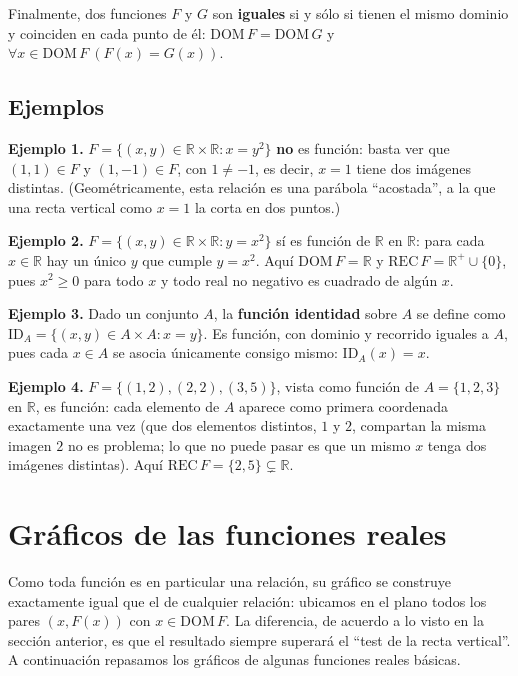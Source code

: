 \documentclass[11pt]{article}
\begin{document}
Finalmente, dos funciones $F$ y $G$ son \textbf{iguales} si y sólo si tienen el mismo dominio y
coinciden en cada punto de él: $\text{DOM}\, F = \text{DOM}\, G$ y
$\forall x \in \text{DOM}\, F \ (F(x) = G(x))$.

\subsection*{Ejemplos}

\textbf{Ejemplo 1.} $F = \{(x,y) \in \mathbb{R}\times\mathbb{R} : x = y^2\}$ \textbf{no} es función:
basta ver que $(1,1) \in F$ y $(1,-1) \in F$, con $1 \neq -1$, es decir, $x=1$ tiene dos imágenes
distintas. (Geométricamente, esta relación es una parábola ``acostada'', a la que una recta
vertical como $x=1$ la corta en dos puntos.)

\textbf{Ejemplo 2.} $F = \{(x,y) \in \mathbb{R}\times\mathbb{R} : y = x^2\}$ sí es función de
$\mathbb{R}$ en $\mathbb{R}$: para cada $x \in \mathbb{R}$ hay un único $y$ que cumple $y = x^2$.
Aquí $\text{DOM}\, F = \mathbb{R}$ y $\text{REC}\, F = \mathbb{R}^+ \cup \{0\}$, pues $x^2 \ge 0$
para todo $x$ y todo real no negativo es cuadrado de algún $x$.

\textbf{Ejemplo 3.} Dado un conjunto $A$, la \textbf{función identidad} sobre $A$ se define como
$\text{ID}_A = \{(x,y) \in A \times A : x = y\}$. Es función, con dominio y recorrido iguales a $A$,
pues cada $x \in A$ se asocia únicamente consigo mismo: $\text{ID}_A(x) = x$.

\textbf{Ejemplo 4.} $F = \{(1,2),(2,2),(3,5)\}$, vista como función de $A=\{1,2,3\}$ en
$\mathbb{R}$, es función: cada elemento de $A$ aparece como primera coordenada exactamente una vez
(que dos elementos distintos, $1$ y $2$, compartan la misma imagen $2$ no es problema; lo que no
puede pasar es que un mismo $x$ tenga dos imágenes distintas). Aquí
$\text{REC}\, F = \{2,5\} \subsetneq \mathbb{R}$.

\section{Gráficos de las funciones reales}

Como toda función es en particular una relación, su gráfico se construye exactamente igual que el
de cualquier relación: ubicamos en el plano todos los pares $(x, F(x))$ con $x \in \text{DOM}\, F$.
La diferencia, de acuerdo a lo visto en la sección anterior, es que el resultado siempre superará el
``test de la recta vertical''. A continuación repasamos los gráficos de algunas funciones reales
básicas.
\end{document}

